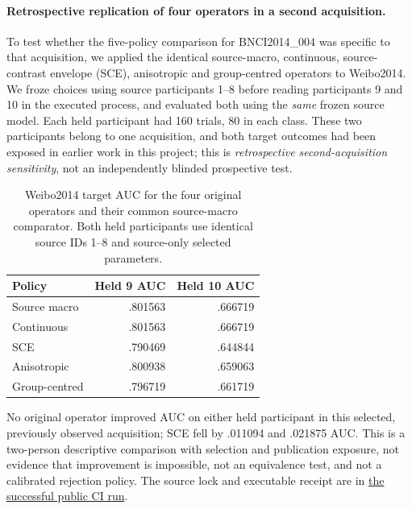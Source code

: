 \paragraph{Retrospective replication of four operators in a second acquisition.}
To test whether the five-policy comparison for BNCI2014\_004 was
specific to that acquisition, we applied the identical source-macro,
continuous, source-contrast envelope (SCE), anisotropic and
group-centred operators to Weibo2014. We froze choices using source
participants 1--8 before reading participants 9 and 10 in the
executed process, and evaluated both using the \emph{same} frozen
source model. Each held participant had 160 trials, 80 in each class.
These two participants belong to one acquisition, and both target
outcomes had been exposed in earlier work in this project; this is
\emph{retrospective second-acquisition sensitivity}, not an
independently blinded prospective test.

\begin{table}[h!]\centering\small
\caption{Weibo2014 target AUC for the four original operators and
their common source-macro comparator. Both held participants use
identical source IDs 1--8 and source-only selected parameters.}
\label{tab:p3-four-weibo}
\begin{tabular}{lrr}
\toprule
Policy & Held 9 AUC & Held 10 AUC\\
\midrule
Source macro & .801563 & .666719\\
Continuous & .801563 & .666719\\
SCE & .790469 & .644844\\
Anisotropic & .800938 & .659063\\
Group-centred & .796719 & .661719\\
\bottomrule
\end{tabular}
\end{table}

No original operator improved AUC on either held participant in this
selected, previously observed acquisition; SCE fell by .011094 and
.021875 AUC. This is a two-person descriptive comparison with
selection and publication exposure, not evidence that improvement is
impossible, not an equivalence test, and not a calibrated rejection
policy. The source lock and executable receipt are in
\href{https://github.com/lindicaphxag-tech/kaggle/actions/runs/38362787873}{the successful public CI run}.
